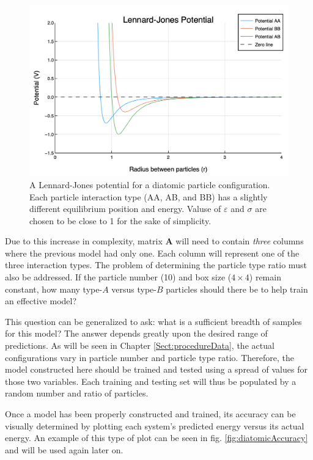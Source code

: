 \begin{figure}%
\centering
\includegraphics[scale = 0.6]{Figures/newLJPotential}
\caption{A Lennard-Jones potential for a diatomic particle configuration. Each particle interaction type (AA, AB, and BB) has a slightly different equilibrium position and energy. Valuse of $\varepsilon$ and $\sigma$ are chosen to be close to 1 for the sake of simplicity.
\label{fig:3LJ}} 
\end{figure}

\par Due to this increase in complexity, matrix $\mathbf{A}$ will need to contain \textit{three} columns where the previous model had only one. Each column will represent one of the three interaction types. The problem of determining the particle type ratio must also be addressed. If the particle number (10) and box size ($4\times4$) remain constant, how many type-$A$ versus type-$B$ particles should there be to help train an effective model?
\par This question can be generalized to ask: what is a sufficient breadth of samples for this model? The answer depends greatly upon the desired range of predictions. As will be seen in Chapter \ref{Sect:procedureData}, the actual configurations vary in particle number and particle type ratio. Therefore, the model constructed here should be trained and tested using a spread of values for those two variables. Each training and testing set will thus be populated by a random number and ratio of particles. 
\par Once a model has been properly constructed and trained, its accuracy can be visually determined by plotting each system's predicted energy versus its actual energy. An example of this type of plot can be seen in fig. \ref{fig:diatomicAccuracy} and will be used again later on.

